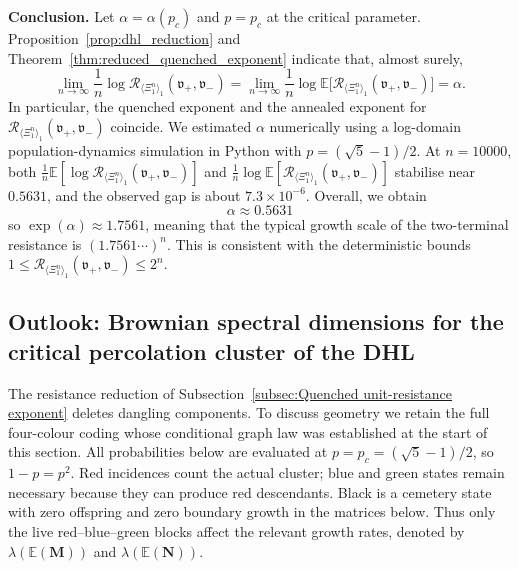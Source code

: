 \documentclass{article}
\theoremstyle{plain}
\theoremstyle{definition}
\newcommand{\Reff}{\mathscr{R}}
\begin{document}
\textbf{Conclusion.} 
Let $\alpha=\alpha(p_c)$ and $p=p_c$ at the critical parameter.
Proposition~\ref{prop:dhl_reduction} and Theorem~\ref{thm:reduced_quenched_exponent} indicate that, almost surely, \[ \lim_{n\to\infty}\frac{1}{n}\log \Reff_{\langle \Xi_1^n \rangle_1}(\mathfrak v_+,\mathfrak v_-) = \lim_{n\to\infty}\frac{1}{n}\log \mathbb E\big[\Reff_{\langle \Xi_1^n \rangle_1}(\mathfrak v_+,\mathfrak v_-)\big] = \alpha. \] 
In particular, the quenched exponent and the annealed exponent for $\Reff_{\langle \Xi_1^n \rangle_1}(\mathfrak v_+,\mathfrak v_-)$ coincide. We estimated $\alpha$ numerically using a log-domain population-dynamics simulation in Python with $p=(\sqrt 5-1)/2$. 
At $n=10000$, both $\frac{1}{n}\mathbb E[\log \Reff_{\langle \Xi_1^n \rangle_1}(\mathfrak v_+,\mathfrak v_-)]$ and $\frac{1}{n}\log \mathbb E[\Reff_{\langle \Xi_1^n \rangle_1}(\mathfrak v_+,\mathfrak v_-)]$ stabilise near $0.5631$, and the observed gap is about $7.3\times 10^{-6}$.
Overall, we obtain \[ \alpha\approx 0.5631 \] so $\exp(\alpha)\approx 1.7561$, meaning that the typical growth scale of the two-terminal resistance is $(1.7561\cdots)^n$. 
This is consistent with the deterministic bounds $1\le \Reff_{\langle \Xi_1^n \rangle_1}(\mathfrak v_+,\mathfrak v_-)\le 2^n$. 











\subsection{Outlook: Brownian spectral dimensions for the critical percolation cluster of the DHL}\label{subsec:dhl_cluster}

\begingroup\color{red}
The resistance reduction of Subsection~\ref{subsec:Quenched unit-resistance exponent}
deletes dangling components. To discuss geometry we retain the full
four-colour coding whose conditional graph law was established at the
start of this section. All probabilities below are evaluated at
$p=p_c=(\sqrt5-1)/2$, so $1-p=p^2$.
Red incidences count the actual cluster; blue and green states remain
necessary because they can produce red descendants.
Black is a cemetery state with zero offspring and zero boundary growth
in the matrices below. Thus only the live red--blue--green blocks affect
the relevant growth rates, denoted by
$\lambda(\mathbb E(\mathbf M))$ and $\lambda(\mathbb E(\mathbf N))$.
\end{document}
